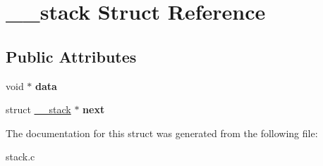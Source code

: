\hypertarget{struct____stack}{
\section{\-\_\-\-\_\-stack \-Struct \-Reference}
\label{struct____stack}
}
\subsection*{\-Public \-Attributes}
\begin{DoxyCompactItemize}
\item 
\hypertarget{struct____stack_a3ca2badbae5aeef99a338d03ebd4df00}{
void $\ast$ {\bfseries data}}
\label{struct____stack_a3ca2badbae5aeef99a338d03ebd4df00}

\item 
\hypertarget{struct____stack_ab059d07b329d91c2a640fffb6186255a}{
struct \hyperlink{struct____stack}{\-\_\-\-\_\-stack} $\ast$ {\bfseries next}}
\label{struct____stack_ab059d07b329d91c2a640fffb6186255a}

\end{DoxyCompactItemize}


\-The documentation for this struct was generated from the following file\-:\begin{DoxyCompactItemize}
\item 
stack.\-c\end{DoxyCompactItemize}
